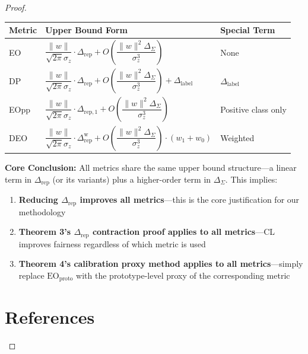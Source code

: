 \documentclass[11pt]{article}
\begin{document}
\begin{proof}
\begin{table}[h]
\centering
\begin{tabular}{|l|l|l|}
\hline
\textbf{Metric} & \textbf{Upper Bound Form} & \textbf{Special Term} \\
\hline
EO & $\dfrac{\|w\|}{\sqrt{2\pi}\sigma_z} \cdot \Delta_{\mathrm{rep}} + O\left(\dfrac{\|w\|^2 \Delta_{\Sigma}}{\sigma_z^3}\right)$ & None \\
\hline
DP & $\dfrac{\|w\|}{\sqrt{2\pi}\sigma_z} \cdot \Delta_{\mathrm{rep}} + O\left(\dfrac{\|w\|^2 \Delta_{\Sigma}}{\sigma_z^3}\right) + \Delta_{\mathrm{label}}$ & $\Delta_{\mathrm{label}}$ \\
\hline
EOpp & $\dfrac{\|w\|}{\sqrt{2\pi}\sigma_z} \cdot \Delta_{\mathrm{rep},1} + O\left(\dfrac{\|w\|^2 \Delta_{\Sigma}}{\sigma_z^3}\right)$ & Positive class only \\
\hline
DEO & $\dfrac{\|w\|}{\sqrt{2\pi}\sigma_z} \cdot \Delta_{\mathrm{rep}}^{\mathrm{w}} + O\left(\dfrac{\|w\|^2 \Delta_{\Sigma}}{\sigma_z^3}\right) \cdot (w_1 + w_0)$ & Weighted \\
\hline
\end{tabular}
\end{table}

\textbf{Core Conclusion:} All metrics share the same upper bound structure---a linear term in $\Delta_{\mathrm{rep}}$ (or its variants) plus a higher-order term in $\Delta_{\Sigma}$. This implies:

\begin{enumerate}
    \item \textbf{Reducing $\Delta_{\mathrm{rep}}$ improves all metrics}---this is the core justification for our methodology
    \item \textbf{Theorem 3's $\Delta_{\mathrm{rep}}$ contraction proof applies to all metrics}---CL improves fairness regardless of which metric is used
    \item \textbf{Theorem 4's calibration proxy method applies to all metrics}---simply replace $\mathrm{EO}_{\mathrm{proto}}$ with the prototype-level proxy of the corresponding metric
\end{enumerate}

\section*{References}


\end{proof}
\end{document}

